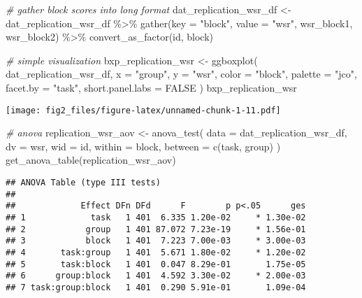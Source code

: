\documentclass[
]{article}
\newenvironment{Shaded}{\begin{snugshade}}{\end{snugshade}}
\newcommand{\AttributeTok}[1]{\textcolor[rgb]{0.77,0.63,0.00}{#1}}
\newcommand{\CommentTok}[1]{\textcolor[rgb]{0.56,0.35,0.01}{\textit{#1}}}
\newcommand{\ConstantTok}[1]{\textcolor[rgb]{0.00,0.00,0.00}{#1}}
\newcommand{\FunctionTok}[1]{\textcolor[rgb]{0.00,0.00,0.00}{#1}}
\newcommand{\NormalTok}[1]{#1}
\newcommand{\OtherTok}[1]{\textcolor[rgb]{0.56,0.35,0.01}{#1}}
\newcommand{\SpecialCharTok}[1]{\textcolor[rgb]{0.00,0.00,0.00}{#1}}
\newcommand{\StringTok}[1]{\textcolor[rgb]{0.31,0.60,0.02}{#1}}
\begin{document}
\begin{Shaded}
\begin{Highlighting}[]
\CommentTok{\# gather block scores into long format}
\NormalTok{dat\_replication\_wsr\_df }\OtherTok{\textless{}{-}}\NormalTok{ dat\_replication\_wsr\_df }\SpecialCharTok{\%\textgreater{}\%}
  \FunctionTok{gather}\NormalTok{(}\AttributeTok{key =} \StringTok{"block"}\NormalTok{, }\AttributeTok{value =} \StringTok{"wsr"}\NormalTok{, wsr\_block1, wsr\_block2) }\SpecialCharTok{\%\textgreater{}\%}
  \FunctionTok{convert\_as\_factor}\NormalTok{(id, block)}

\CommentTok{\# simple visualization}
\NormalTok{bxp\_replication\_wsr }\OtherTok{\textless{}{-}} \FunctionTok{ggboxplot}\NormalTok{(}
\NormalTok{  dat\_replication\_wsr\_df, }\AttributeTok{x =} \StringTok{"group"}\NormalTok{, }\AttributeTok{y =} \StringTok{"wsr"}\NormalTok{,}
  \AttributeTok{color =} \StringTok{"block"}\NormalTok{, }\AttributeTok{palette =} \StringTok{"jco"}\NormalTok{,}
  \AttributeTok{facet.by =} \StringTok{"task"}\NormalTok{, }\AttributeTok{short.panel.labs =} \ConstantTok{FALSE}
\NormalTok{)}
\NormalTok{bxp\_replication\_wsr}
\end{Highlighting}
\end{Shaded}

\texttt{[image: fig2\_files/figure-latex/unnamed-chunk-1-11.pdf]}

\begin{Shaded}
\begin{Highlighting}[]
\CommentTok{\# anova}
\NormalTok{replication\_wsr\_aov }\OtherTok{\textless{}{-}} \FunctionTok{anova\_test}\NormalTok{(}
  \AttributeTok{data =}\NormalTok{ dat\_replication\_wsr\_df, }\AttributeTok{dv =}\NormalTok{ wsr, }\AttributeTok{wid =}\NormalTok{ id,}
  \AttributeTok{within =}\NormalTok{ block, }\AttributeTok{between =} \FunctionTok{c}\NormalTok{(task, group)}
\NormalTok{)}
\FunctionTok{get\_anova\_table}\NormalTok{(replication\_wsr\_aov)}
\end{Highlighting}
\end{Shaded}

\begin{verbatim}
## ANOVA Table (type III tests)
## 
##             Effect DFn DFd      F        p p<.05      ges
## 1             task   1 401  6.335 1.20e-02     * 1.30e-02
## 2            group   1 401 87.072 7.23e-19     * 1.56e-01
## 3            block   1 401  7.223 7.00e-03     * 3.00e-03
## 4       task:group   1 401  5.671 1.80e-02     * 1.20e-02
## 5       task:block   1 401  0.047 8.29e-01       1.75e-05
## 6      group:block   1 401  4.592 3.30e-02     * 2.00e-03
## 7 task:group:block   1 401  0.290 5.91e-01       1.09e-04
\end{verbatim}
\end{document}
